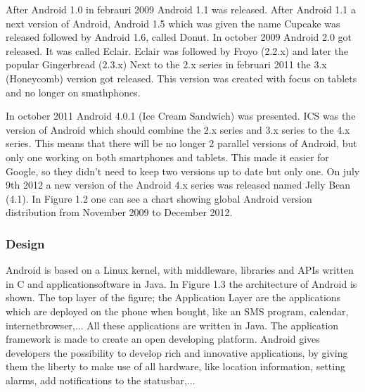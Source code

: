 \documentclass[a4paper,12pt]{report}
\begin{document}
After Android 1.0 in febrauri 2009 Android 1.1 was released. After Android 1.1 a next version of Android, Android 1.5 which was given the name Cupcake was released followed by 
Android 1.6, called Donut. In october 2009 Android 2.0 got released. It was called Eclair. Eclair was followed by Froyo (2.2.x) and later the popular Gingerbread (2.3.x)
Next to the 2.x series in februari 2011 the 3.x (Honeycomb) version got released. This version was created with focus on tablets and no longer on smathphones.

In october 2011 Android 4.0.1 (Ice Cream Sandwich) was presented. ICS was the version of Android which should combine the 2.x series and 3.x series to the 4.x series.
This means that there will be no longer 2 parallel versions of Android, but only one working on both smartphones and tablets. This made it easier for Google, so they 
didn't need to keep two versions up to date but only one. On july 9th 2012 a new version of the Android 4.x series was released named Jelly Bean (4.1).
In Figure 1.2 one can see a chart showing global Android version distribution from November 2009 to December 2012.

\subsubsection{Design}

Android is based on a Linux kernel, with middleware, libraries and APIs written in C and applicationsoftware in Java. In Figure 1.3 the architecture of Android is shown.
The top layer of the figure; the Application Layer are the applications which are deployed on the phone when bought, like an SMS program, calendar, internetbrowser,...
All these applications are written in Java. The application framework is made to create an open developing platform. Android gives developers the possibility to develop
rich and innovative applications, by giving them the liberty to make use of all hardware, like location information, setting alarms, add notifications to the statusbar,...
\end{document}

